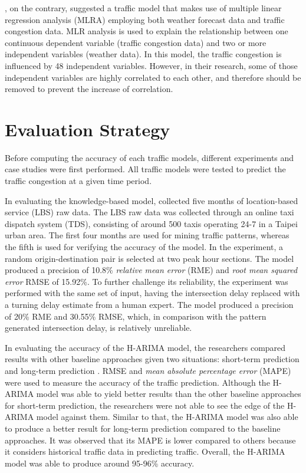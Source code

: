 , on the contrary, suggested a traffic model that makes use of multiple linear regression analysis (MLRA) employing both weather forecast data and traffic congestion data. MLR analysis is used to explain the relationship between one continuous dependent variable (traffic congestion data) and two or more independent variables (weather data). In this model, the traffic congestion is influenced by 48 independent variables. However, in their research, some of those independent variables are highly correlated to each other, and therefore should be removed to prevent the increase of correlation. 






\section{Evaluation Strategy}
Before computing the accuracy of each traffic models, different experiments and case studies were first performed. All traffic models were tested to predict the traffic congestion at a given time period.

In evaluating the knowledge-based model,  collected five months of location-based service (LBS) raw data. The LBS raw data was collected through an online taxi dispatch system (TDS), consisting of around 500 taxis operating 24-7 in a Taipei urban area. The first four months are used for mining traffic patterns, whereas the fifth is used for verifying the accuracy of the model. In the experiment, a random origin-destination pair is selected at two peak hour sections. The model produced a precision of 10.8\% \textit{relative mean error} (RME) and \textit{root mean squared error} RMSE of 15.92\%. To further challenge its reliability, the experiment was performed with the same set of input, having the intersection delay replaced with a turning delay estimate from a human expert. The model produced a precision of 20\% RME and 30.55\% RMSE, which, in comparison with the pattern generated intersection delay, is relatively unreliable. 

In evaluating the accuracy of the H-ARIMA model, the researchers compared results with other baseline approaches given two situations: short-term prediction and long-term prediction . RMSE and \textit{mean absolute percentage error} (MAPE) were used to measure the accuracy of the traffic prediction. Although the H-ARIMA model was able to yield better results than the other baseline approaches for short-term prediction, the researchers were not able to see the edge of the H-ARIMA model against them. Similar to that, the H-ARIMA model was also able to produce a better result for long-term prediction compared to the baseline approaches. It was observed that its MAPE is lower compared to others because it considers historical traffic data in predicting traffic. Overall, the H-ARIMA model was able to produce around 95-96\% accuracy.

